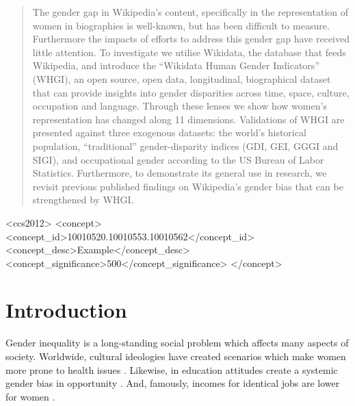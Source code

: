 \documentclass{sig-alternate-05-2015}
\begin{document}
\maketitle
\begin{abstract}
The gender gap in Wikipedia's content, specifically in the representation of women in biographies is well-known, but has been difficult to measure. Furthermore the impacts of efforts to address this gender gap have received little attention. To investigate we utilise Wikidata, the database that feeds Wikipedia, and introduce the ``Wikidata Human Gender Indicators'' (WHGI), an open source, open data, longitudinal, biographical dataset that can provide insights into gender disparities across time, space, culture, occupation and language. Through these lenses we show how women's representation has changed along 11 dimensions. Validations of WHGI are presented against three exogenous datasets: the world's historical population, ``traditional'' gender-disparity indices (GDI, GEI, GGGI and SIGI), and occupational gender according to the US Bureau of Labor Statistics. Furthermore, to demonstrate its general use in research, we revisit previous published findings on Wikipedia's gender bias that can be strengthened by WHGI. 
\end{abstract}


%
%
\begin{CCSXML}
<ccs2012>
 <concept>
  <concept_id>10010520.10010553.10010562</concept_id>
  <concept_desc>Example</concept_desc>
  <concept_significance>500</concept_significance>
 </concept>

\end{CCSXML}



%
%

%
%
\printccsdesc



\section{Introduction}

Gender inequality is a long-standing social problem which affects many aspects of society. Worldwide, cultural ideologies have created scenarios which make women more prone to health issues \cite{world_health_organization_women_2009}. Likewise, in education attitudes create a systemic gender bias in opportunity \cite{heward_gender_1999}. And, famously, incomes for identical jobs are lower for women \cite{burstein_equal_????}.
\end{document}

